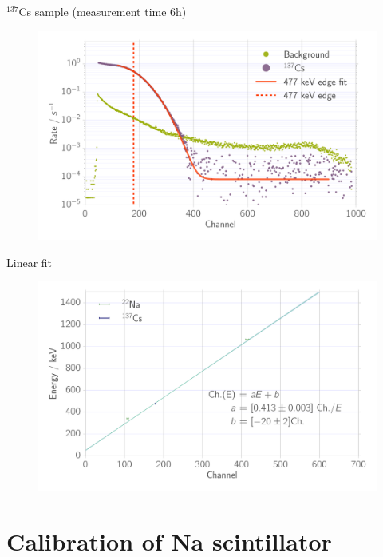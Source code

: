 \documentclass[xcolor=x11names,compress]{beamer}
\renewcommand{\(}{\begin{columns}}
\renewcommand{\)}{\end{columns}}
\newcommand{\<}[1]{\begin{column}{#1}}
\renewcommand{\>}{\end{column}}
\begin{document}
\begin{frame}[t]{$^{137}$Cs sample (measurement time 6h) }

\begin{figure}[htpb]
\centering
\includegraphics[width=1.0\linewidth]{../analysis/figures/calib_ps_cs}
\label{fig:calib_ps_cs}
\end{figure}

\end{frame}

\begin{frame}[t]{Linear fit}
    
\begin{figure}[htpb]
    \centering
    \includegraphics[width=1.0\linewidth]{../analysis/figures/calibration_ps_linear_fit}
\label{fig:calibration_ps_linear_fit}
\end{figure}
\end{frame}

\section{Calibration of Na scintillator}
\end{document}
